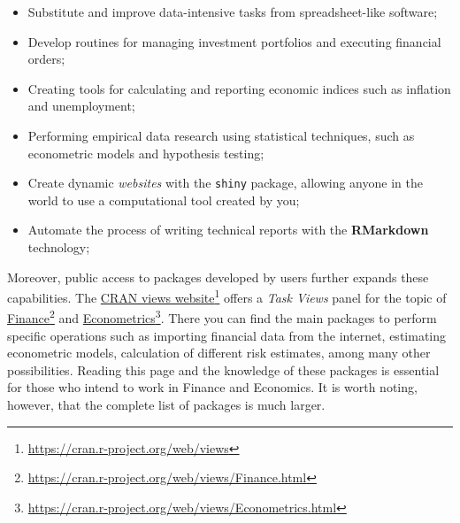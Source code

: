 \documentclass[
  12pt,
]{book}
\begin{document}
\begin{itemize}
\item
  Substitute and improve data-intensive tasks from spreadsheet-like software;
\item
  Develop routines for managing investment portfolios and executing financial orders;
\item
  Creating tools for calculating and reporting economic indices such as inflation and unemployment;
\item
  Performing empirical data research using statistical techniques, such as econometric models and hypothesis testing;
\item
  Create dynamic \emph{websites} with the \texttt{shiny} \citep{R-shiny} package, allowing anyone in the world to use a computational tool created by you; 
\item
  Automate the process of writing technical reports with the \textbf{RMarkdown} technology; 
\end{itemize}

Moreover, public access to packages developed by users further expands these capabilities. The \href{https://cran.r-project.org/web/views}{CRAN views website}\footnote{\url{https://cran.r-project.org/web/views}} offers a \emph{Task Views} panel for the topic of \href{https://cran.r-project.org/web/views/Finance.html}{Finance}\footnote{\url{https://cran.r-project.org/web/views/Finance.html}} and \href{https://cran.r-project.org/web/views/Econometrics.html}{Econometrics}\footnote{\url{https://cran.r-project.org/web/views/Econometrics.html}}. There you can find the main packages to perform specific operations such as importing financial data from the internet, estimating econometric models, calculation of different risk estimates, among many other possibilities. Reading this page and the knowledge of these packages is essential for those who intend to work in Finance and Economics. It is worth noting, however, that the complete list of packages is much larger.
\end{document}
